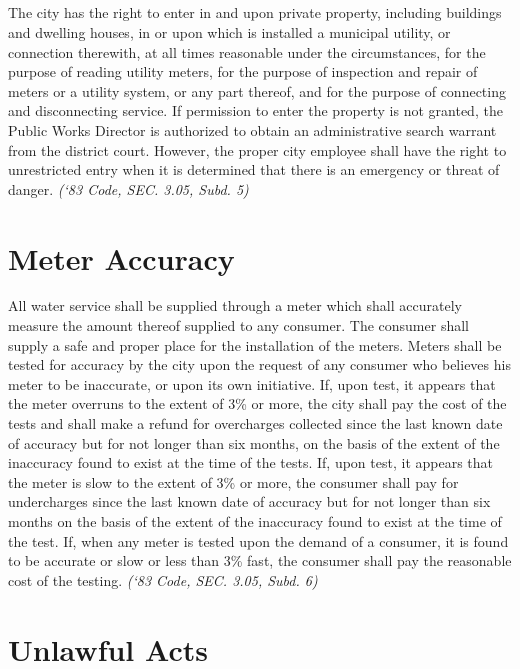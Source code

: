 \subsection{}
The city has the right to enter in and upon private property, including buildings and dwelling houses, in or upon which is installed a municipal utility, or connection therewith, at all times reasonable under the circumstances, for the purpose of reading utility meters, for the purpose of inspection and repair of meters or a utility system, or any part thereof, and for the purpose of connecting and disconnecting service.  If permission to enter the property is not granted, the Public Works Director is authorized to obtain an administrative search warrant from the district court.  However, the proper city employee shall have the right to unrestricted entry when it is determined that there is an emergency or threat of danger.\newline
\emph{(‘83 Code, SEC. 3.05, Subd. 5)}
\section{Meter Accuracy}
All water service shall be supplied through a meter which shall accurately measure the amount thereof supplied to any consumer. The consumer shall supply a safe and proper place for the installation of the meters. Meters shall be tested for accuracy by the city upon the request of any consumer who believes his meter to be inaccurate, or upon its own initiative.  If, upon test, it appears that the meter overruns to the extent of 3\% or more, the city shall pay the cost of the tests and shall make a refund for overcharges collected since the last known date of accuracy but for not longer than six months, on the basis of the extent of the inaccuracy found to exist at the time of the tests.  If, upon test, it appears that the meter is slow to the extent of 3\% or more, the consumer shall pay for undercharges since the last known date of accuracy but for not longer than six months on the basis of the extent of the inaccuracy found to exist at the time of the test.  If, when any meter is tested upon the demand of a consumer, it is found to be accurate or slow or less than 3\% fast, the consumer shall pay the reasonable cost of the testing.\newline
\emph{(‘83 Code, SEC. 3.05, Subd. 6)}
\section{Unlawful Acts}
